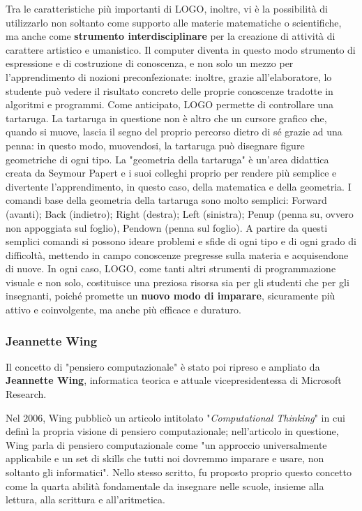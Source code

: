 Tra le caratteristiche più importanti di LOGO, inoltre, vi è la possibilità di utilizzarlo non soltanto come supporto alle materie matematiche o scientifiche, 
ma anche come \textbf{strumento interdisciplinare} per la creazione di attività di carattere artistico e umanistico.
Il computer diventa in questo modo strumento di espressione e di costruzione di conoscenza, e non solo un mezzo per l'apprendimento di nozioni preconfezionate: inoltre, grazie
all'elaboratore, lo studente può vedere il risultato concreto delle proprie conoscenze tradotte in algoritmi e programmi.
Come anticipato, LOGO permette di controllare una tartaruga. La tartaruga in questione non è altro che un cursore grafico che, quando si muove, lascia il segno 
del proprio percorso dietro di sé grazie ad una penna: in questo modo, muovendosi, la tartaruga può disegnare figure geometriche di ogni tipo.
La "geometria della tartaruga" è un'area didattica creata da Seymour Papert e i suoi colleghi proprio per rendere più semplice e divertente l'apprendimento, in questo caso, della matematica e della geometria.
I comandi base della geometria della tartaruga sono molto semplici: Forward (avanti); Back (indietro); Right (destra); Left (sinistra); Penup (penna su, ovvero non appoggiata sul foglio), Pendown (penna sul foglio). 
A partire da questi semplici comandi si possono ideare problemi e sfide di ogni tipo e di ogni grado di difficoltà, mettendo in campo conoscenze pregresse sulla materia e acquisendone di nuove. 
In ogni caso, LOGO, come tanti altri strumenti di programmazione visuale e non solo, costituisce una preziosa risorsa sia per gli studenti che per gli insegnanti, poiché 
promette un \textbf{nuovo modo di imparare}, sicuramente più attivo e coinvolgente, ma anche più efficace e duraturo.


\subsubsection{Jeannette Wing}
Il concetto di "pensiero computazionale" è stato poi ripreso e ampliato da \textbf{Jeannette Wing}, informatica teorica e attuale vicepresidentessa di Microsoft Research.

Nel 2006, Wing pubblicò un articolo intitolato "\textit{Computational Thinking}" in cui definì la propria visione di pensiero computazionale; nell'articolo in questione, 
Wing parla di pensiero computazionale come "un approccio universalmente applicabile e un set di skills che tutti noi dovremmo imparare e usare, non soltanto gli informatici". Nello stesso scritto,
fu proposto proprio questo concetto come la quarta abilità
fondamentale da insegnare nelle scuole, insieme alla lettura, alla scrittura e all'aritmetica.

